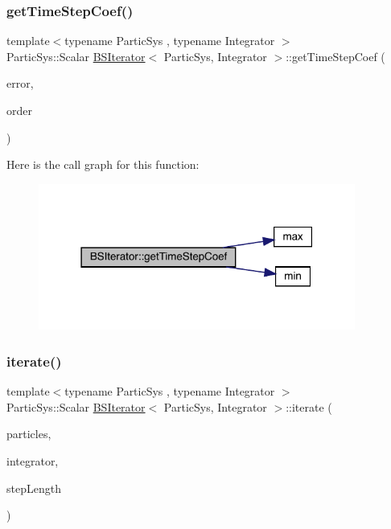 \subsubsection{\texorpdfstring{get\+Time\+Step\+Coef()}{getTimeStepCoef()}}
{\footnotesize\ttfamily template$<$typename Partic\+Sys , typename Integrator $>$ \\
Partic\+Sys\+::\+Scalar \mbox{\hyperlink{class_b_s_iterator}{B\+S\+Iterator}}$<$ Partic\+Sys, Integrator $>$\+::get\+Time\+Step\+Coef (\begin{DoxyParamCaption}\item[{\mbox{\hyperlink{class_b_s_iterator_a7857f8ff9032955ea4dcc22cd18ca7a1}{Scalar}}}]{error,  }\item[{size\+\_\+t}]{order }\end{DoxyParamCaption})\hspace{0.3cm}{\ttfamily [private]}}

Here is the call graph for this function\+:
\nopagebreak
\begin{figure}[H]
\begin{center}
\leavevmode
\includegraphics[width=295pt]{class_b_s_iterator_a9d06a0d0c9e458ea96952b0514adece9_cgraph}
\end{center}
\end{figure}
\mbox{\label{class_b_s_iterator_a5520642ecbd454fb1f4d9ece18dc4e3f}} 
\subsubsection{\texorpdfstring{iterate()}{iterate()}}
{\footnotesize\ttfamily template$<$typename Partic\+Sys , typename Integrator $>$ \\
Partic\+Sys\+::\+Scalar \mbox{\hyperlink{class_b_s_iterator}{B\+S\+Iterator}}$<$ Partic\+Sys, Integrator $>$\+::iterate (\begin{DoxyParamCaption}\item[{Partic\+Sys \&}]{particles,  }\item[{Integrator \&}]{integrator,  }\item[{\mbox{\hyperlink{class_b_s_iterator_a7857f8ff9032955ea4dcc22cd18ca7a1}{Scalar}}}]{step\+Length }\end{DoxyParamCaption})}

